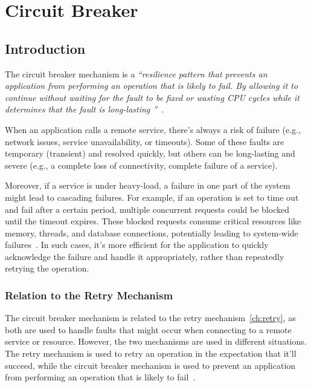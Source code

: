 \chapter{Circuit Breaker}\label{ch:circuit-breaker}



\section{Introduction}\label{sec:cbreaker-introduction}

The circuit breaker mechanism is a \textit{\enquote{resilience pattern
that prevents an application from performing an operation that is likely to fail.
By allowing it
to continue
without waiting for the fault to be fixed or wasting CPU cycles while it determines that the fault is long-lasting
}}~\cite{microsoft-cbreaker-pattern}.

When an application calls a remote service, there's always a risk of failure
(e.g., network issues, service unavailability, or timeouts).
Some of these faults are temporary (transient) and resolved quickly,
but others can be long-lasting and severe (e.g., a complete loss of connectivity, complete failure of a service).

Moreover, if a service is under heavy-load, a failure in one part of the system might lead to cascading failures.
For example, if an operation is set to time out and fail after a certain period, multiple concurrent requests could be blocked until the timeout expires.
These blocked requests consume critical resources like memory, threads, and database connections, potentially leading to system-wide failures~\cite{microsoft-cbreaker-pattern}.
In such cases, it’s more efficient for the application to quickly acknowledge the failure and handle it appropriately, rather than repeatedly retrying the operation.

\subsection{Relation to the Retry Mechanism}\label{subsec:cbreaker-relation-to-retry}

The circuit breaker mechanism is related to the retry mechanism~\ref{ch:retry}, as both are used to handle faults that might occur when connecting to a remote service or resource.
However, the two mechanisms are used in different situations.
The retry mechanism is used to retry an operation in the expectation that it'll succeed, while the circuit breaker mechanism is used to prevent an application from performing an operation that is likely to fail~\cite{microsoft-cbreaker-pattern}.

